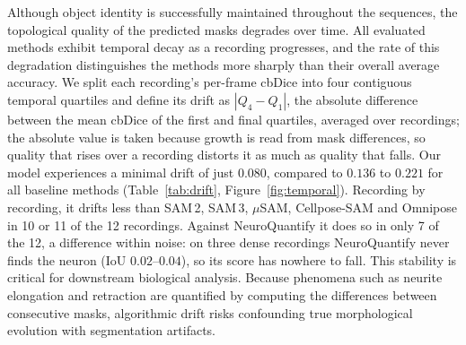 \documentclass[11pt,a4paper]{article}
\begin{document}
Although object identity is successfully maintained throughout the sequences,
the topological quality of the predicted masks degrades over time. All
evaluated methods exhibit temporal decay as a recording progresses, and the
rate of this degradation distinguishes the methods more sharply than their
overall average accuracy. We split each recording's per-frame cbDice into
four contiguous temporal quartiles and define its drift as $|Q_4 - Q_1|$, the
absolute difference between the mean cbDice of the first and final quartiles,
averaged over recordings; the absolute value is taken because growth is read
from mask differences, so quality that rises over a recording distorts it as
much as quality that falls. Our model experiences a minimal drift of just
$0.080$, compared to $0.136$ to $0.221$ for all baseline methods
(Table~\ref{tab:drift}, Figure~\ref{fig:temporal}). Recording by recording,
it drifts less than SAM\,2, SAM\,3, $\mu$SAM, Cellpose-SAM and Omnipose in 10
or 11 of the 12 recordings. Against NeuroQuantify it does so in only 7 of the
12, a difference within noise: on three dense recordings NeuroQuantify never
finds the neuron (IoU $0.02$--$0.04$), so its score has nowhere to fall. This
stability is critical for downstream biological analysis. Because phenomena
such as neurite elongation and retraction are quantified by computing the
differences between consecutive masks, algorithmic drift risks confounding
true morphological evolution with segmentation artifacts.
\end{document}
